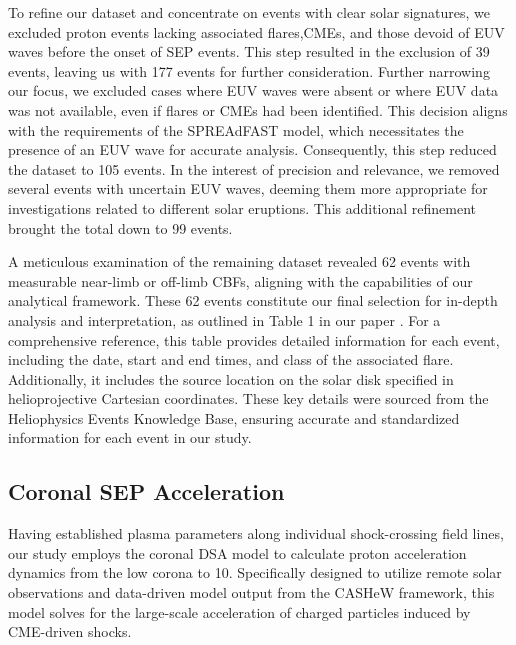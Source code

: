 To refine our dataset and concentrate on events with clear solar signatures, we excluded proton events lacking associated flares,CMEs, and those devoid of EUV waves before the onset of SEP events. This step resulted in the exclusion of 39 events, leaving us with 177 events for further consideration.
Further narrowing our focus, we excluded cases where EUV waves were absent or where EUV data was not available, even if flares or CMEs had been identified. This decision aligns with the requirements of the SPREAdFAST model, which necessitates the presence of an EUV wave for accurate analysis. Consequently, this step reduced the dataset to 105 events.
In the interest of precision and relevance, we removed several events with uncertain EUV waves, deeming them more appropriate for investigations related to different solar eruptions. This additional refinement brought the total down to 99 events.

A meticulous examination of the remaining dataset revealed 62 events with measurable near-limb or off-limb CBFs, aligning with the capabilities of our analytical framework. These 62 events constitute our final selection for in-depth analysis and interpretation, as outlined in Table 1 in our paper \citep{kozarev_2022}.
For a comprehensive reference, this table provides detailed information for each event, including the date, start and end times, and class of the associated flare. Additionally, it includes the source location on the solar disk specified in helioprojective Cartesian coordinates. These key details were sourced from the Heliophysics Events Knowledge Base, ensuring accurate and standardized information for each event in our study.

\subsection{Coronal SEP Acceleration}
Having established plasma parameters along individual shock-crossing field lines, our study employs the coronal DSA model \citep{kozarev_2016, kozarev_2019} to calculate proton acceleration dynamics from the low corona to 10\rsun. Specifically designed to utilize remote solar observations and data-driven model output from the CASHeW framework, this model solves for the large-scale acceleration of charged particles induced by CME-driven shocks.

